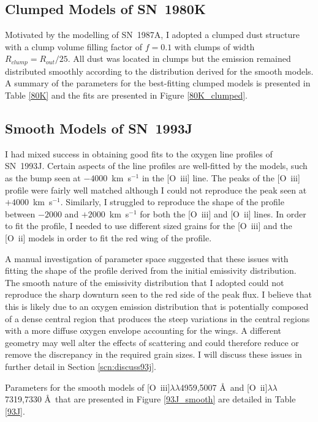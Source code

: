 \subsection{Clumped Models of SN~1980K}

Motivated by the modelling of SN~1987A, I adopted a clumped dust structure with a clump volume filling factor of $f=0.1$ with clumps of width $R_{clump}=R_{out}/25$.  All dust was located in clumps but the emission remained distributed smoothly according to the distribution derived for the smooth models.  A summary of the parameters for the best-fitting clumped models is presented in Table \ref{80K} and the fits are presented in Figure \ref{80K_clumped}.





\subsection{Smooth Models of SN~1993J}
I had mixed success in obtaining good fits to the oxygen line profiles of SN~1993J.  Certain aspects of the line profiles are well-fitted by the models, such as the bump seen at $-4000$~km~s$^{-1}$ in the [O~{\sc iii}] line.  The peaks of the [O~{\sc iii}] profile were fairly well matched although I could not reproduce the peak seen at $+4000$~km~s$^{-1}$.  Similarly, I struggled to reproduce the shape of the profile between $-2000$ and $+2000$~km~s$^{-1}$ for both the [O~{\sc iii}] and [O~{\sc ii}] lines.  In order to fit the profile, I needed to use different sized grains for the [O~{\sc iii}] and the [O~{\sc ii}] models in order to fit the red wing of the profile.


A manual investigation of parameter space suggested that these issues with fitting the shape of the profile derived from the initial emissivity distribution.  The smooth nature of the emissivity distribution that I adopted could not reproduce the sharp downturn seen to the red side of the peak flux.  I believe that this is likely due to an oxygen emission distribution that is potentially composed of a dense central region that produces the steep variations in the central regions with a more diffuse oxygen envelope accounting for the wings.  A different geometry may well alter the effects of scattering and could therefore reduce or remove the discrepancy in the required grain sizes.  I will discuss these issues in further detail in Section \ref{scn:discuss93j}.

Parameters for the smooth models of [O~{\sc iii}]$\lambda\lambda$4959,5007 \AA\ and [O~{\sc ii}]$\lambda\lambda$7319,7330 \AA\   that are presented in Figure \ref{93J_smooth} are detailed in Table \ref{93J}. 
 
